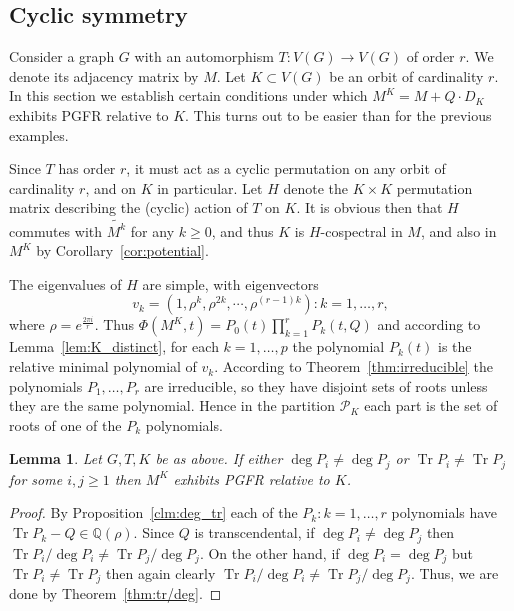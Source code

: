 \documentclass[11pt]{article}
\newtheorem{lemma}[theo]{Lemma}
\theoremstyle{definition}
\numberwithin{equation}{section}
\newcommand{\PK}[1][K]{\mathcal{P}_{#1}}
\newcommand\+{\mkern2mu}
\newcommand{\Q}{\mathbb{Q}}
\newcommand{\1}{\mathbf 1}
\DeclareMathOperator{\Tr}{Tr}
\begin{document}
\subsection{Cyclic symmetry}

\newcommand{\ord}{r}

Consider a graph $G$ with an automorphism $T : V(G) \to V(G)$ of order $\ord$. We denote its adjacency matrix by $M$. Let $K \subset V(G)$ be an orbit of cardinality $\ord$. In this section we establish certain conditions under which $M^K = M + Q \cdot D_K$ exhibits PGFR relative to $K$. This turns out to be easier than for the previous examples.

Since $T$ has order $\ord$, it must act as a cyclic permutation on any orbit of cardinality $\ord$, and on $K$ in particular. Let $H$ denote the $K \times K$ permutation matrix describing the (cyclic) action of $T$ on $K$. It is obvious then that $H$ commutes with $\widetilde{M^k}$ for any $k \geq 0$, and thus $K$ is $H$-cospectral in $M$, and also in $M^K$ by Corollary~\ref{cor:potential}.  
 
 The eigenvalues of $H$ are simple, with eigenvectors 
 \begin{equation}\label{eq:vk}
 v_k = (1,\rho^k, \rho^{2k}, \cdots, \rho^{(\ord-1)k})  : k = 1,\dots, \ord, 
 \end{equation} 
 where $\rho = e^{\frac{2\pi i}{\ord}}$. Thus $\Phi(M^K,t) = P_0(t) \prod_{k=1}^{\ord} P_k(t,Q)$ and according to Lemma~\ref{lem:K_distinct}, for each $k=1, \dots, p$ the polynomial $P_k(t)$ is the relative minimal polynomial of $v_k$. According to Theorem~\ref{thm:irreducible} the polynomials $P_1, \dots, P_{\ord}$ are irreducible, so they have disjoint sets of roots unless they are the same polynomial. Hence in the partition $\PK$ each part is the set of roots of one of the $P_k$ polynomials. 

\begin{lemma}\label{lem:main_cyclic}
Let $G,T,K$ be as above. If either $\deg P_i \neq \deg P_j$ or $\Tr P_i \neq \Tr P_j$ for some $i,j \geq 1$ then $M^K$ exhibits PGFR relative to $K$.
\end{lemma}

\begin{proof}
By Proposition~\ref{clm:deg_tr} each of the $P_k : k =1,\dots, \ord$ polynomials have $\Tr P_k - Q \in \Q(\rho)$. Since $Q$ is transcendental, if $\deg P_i \neq \deg P_j$ then $\Tr P_i / \deg P_i \neq \Tr P_j / \deg P_j$. On the other hand, if $\deg P_i =\deg P_j$ but $\Tr P_i \neq \Tr P_j$ then again clearly $\Tr P_i / \deg P_i \neq \Tr P_j / \deg P_j$. Thus, we are done by Theorem~\ref{thm:tr/deg}.
\end{proof}
\end{document}
